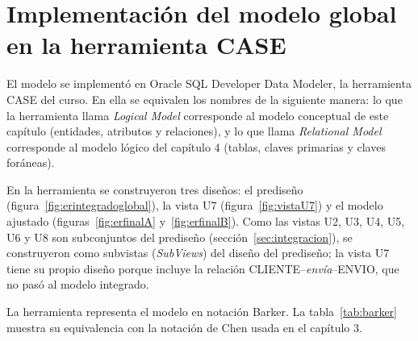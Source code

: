 
\section{Implementación del modelo global en la herramienta CASE}
\label{anx:case}


El modelo se implementó en Oracle SQL Developer Data Modeler, la
herramienta CASE del curso. En ella se equivalen los nombres de la
siguiente manera: lo que la herramienta llama \textit{Logical Model}
corresponde al modelo conceptual de este capítulo (entidades, atributos
y relaciones), y lo que llama \textit{Relational Model} corresponde al
modelo lógico del capítulo 4 (tablas, claves primarias y claves
foráneas).

En la herramienta se construyeron tres diseños: el prediseño
(figura~\ref{fig:erintegradoglobal}), la vista U7
(figura~\ref{fig:vistaU7}) y el modelo ajustado
(figuras~\ref{fig:erfinalA} y~\ref{fig:erfinalB}). Como las vistas U2,
U3, U4, U5, U6 y U8 son subconjuntos del prediseño
(sección~\ref{sec:integracion}), se construyeron como subvistas
(\textit{SubViews}) del diseño del prediseño; la vista U7 tiene su propio
diseño porque incluye la relación CLIENTE--\textit{envía}--ENVIO, que no
pasó al modelo integrado.

La herramienta representa el modelo en notación Barker. La
tabla~\ref{tab:barker} muestra su equivalencia con la notación de Chen
usada en el capítulo 3.


